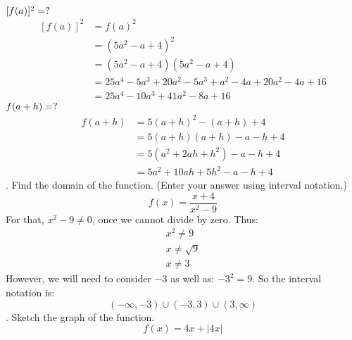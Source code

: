 \documentclass{article}
\begin{document}
\newline\newline
$[f(a)]^2 = \space ?$
\begin{equation}
\begin{split}
    [f(a)]^2 & = f(a) ^ 2 \\
    & = (5a^2 - a + 4)^2 \\
    & = (5a^2 - a + 4) (5a^2 - a + 4) \\
    & = 25a^4 - 5a^3 + 20a^2 - 5a^3  + a^2 - 4a + 20a^2 -4a + 16 \\
    & = 25a^4 - 10a^3 + 41a^2 - 8a + 16
\end{split}
\end{equation}
\newline\newline
$f(a + h) = \space ?$
\begin{equation}
\begin{split}
    f(a + h) & = 5(a + h)^2 - (a + h) + 4 \\
    & = 5(a + h)(a + h) - a - h + 4 \\
    & = 5(a^2 + 2ah + h^2) - a - h + 4 \\
    & = 5a^2 + 10ah + 5h^2 - a - h + 4
\end{split}
\end{equation}
\newline{}. Find the domain of the function. (Enter your answer using interval notation.)
\begin{equation}
    f(x) = \frac{x + 4}{x^2 - 9}
\end{equation}
\newline\newline
For that, $x^2 - 9 \neq 0$, once we cannot divide by zero. Thus:
\begin{equation}
\begin{split}
    x^2 \neq 9 \\
    x \neq \sqrt{9} \\
    x \neq 3
\end{split}
\end{equation}
However, we will need to consider $-3$ as well as: $-3^2=9$.
So the interval notation is: 
\[ (-\infty, -3) \cup (-3,3) \cup (3, \infty) \]
\newline{}. Sketch the graph of the function.
\begin{equation}
    f(x) = 4x + |4x|
\end{equation}
\newline\newline
\end{document}
